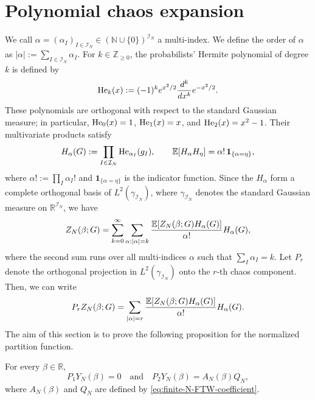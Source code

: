 \documentclass[../CLT_SYK.tex]{subfiles}
\begin{document}
\section{Polynomial chaos expansion}
\label{sec:chaos-decomposition}
We call $\alpha=(\alpha_I)_{I\in\mathcal I_N} \in (\mathbb N\cup\{0\})^{\mathcal I_N}$  a multi-index. We define the order of $\alpha$ as $|\alpha| := \sum_{I\in\mathcal I_N} \alpha_I $.
  {For $k\in\mathbb Z_{\geq0}$, the probabilists' Hermite
 polynomial of degree $k$ is defined by
 \[
   {\rm He}_k(x):=(-1)^k e^{x^2/2}\frac{d^k}{dx^k}e^{-x^2/2}.
 \]
 These polynomials are orthogonal with respect to the standard Gaussian
 measure; in particular, ${\rm He}_0(x)=1$, ${\rm He}_1(x)=x$, and
 ${\rm He}_2(x)=x^2-1$.  Their multivariate products satisfy}
\begin{equation*}
  H_\alpha(G):=\prod_{I\in\mathcal I_N}{\rm He}_{\alpha_I}(g_I),
  \qquad
  \mathbb E[H_\alpha H_\eta]
  =\alpha!\,\mathbf 1_{\{\alpha=\eta\}},
\end{equation*}
where $\alpha!:=\prod_I\alpha_I!${ and
$\mathbf 1_{\{\alpha=\eta\}}$ is the indicator function}. Since the $H_\alpha$ form a complete
orthogonal basis of $L^2(\gamma_{\mathcal I_N})$, where
$\gamma_{\mathcal I_N}$ denotes {the} standard Gaussian measure on
$\mathbb R^{\mathcal I_N}$, we have
\begin{align}\label{eq: chaos}
Z_N(\beta;G) ={\sum_{k=0}^\infty \sum_{\alpha:|\alpha|=k} \frac{\mathbb E[Z_N(\beta;G)H_\alpha(G)]}{\alpha!} H_\alpha(G)},
\end{align}
where the second sum runs over all multi-indices $\alpha$ such that $\sum_{I} \alpha_I = k$.  Let $P_r$ denote the orthogonal projection in
$L^2(\gamma_{\mathcal I_N})$ onto the $r$-th  chaos {component}.
Then, we can write
\[
  P_r Z_N(\beta;G)
  =\sum_{|\alpha|=r}
  	\frac{\mathbb E[Z_N(\beta;G)H_\alpha(G)]}{\alpha!}H_\alpha(G).
\]
The aim of this section is to prove the following proposition for the normalized partition function.
\begin{proposition}\label{prop:exact-second-chaos}
	For every $\beta\in \mathbb R$,
	\[
	P_1Y_N(\beta)=0\quad \text{and} \quad P_2 Y_N(\beta)
	=A_N(\beta)Q_N,
	\]
	where $A_N(\beta)$ and $Q_N$ are defined by \eqref{eq:finite-N-FTW-coefficient}.
\end{proposition}
\end{document}
